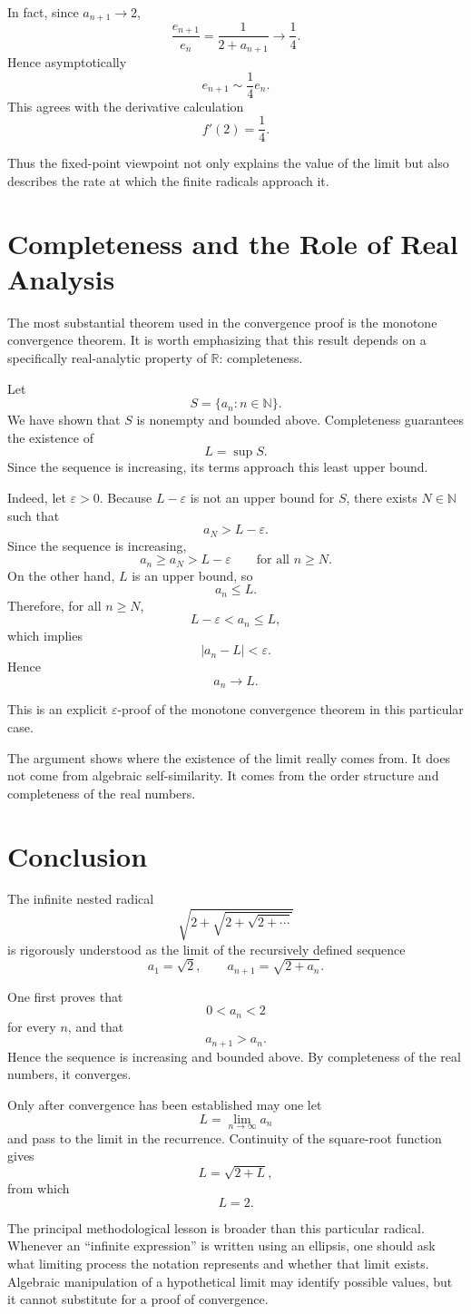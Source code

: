 \documentclass{essay}
\begin{document}
In fact, since \(a_{n+1}\to 2\),
\[
\frac{e_{n+1}}{e_n}
=
\frac{1}{2+a_{n+1}}
\longrightarrow
\frac14.
\]
Hence asymptotically
\[
e_{n+1}\sim \frac14 e_n.
\]
This agrees with the derivative calculation
\[
f'(2)=\frac14.
\]

Thus the fixed-point viewpoint not only explains the value of the limit but also describes the rate at which the finite radicals approach it.

\section{Completeness and the Role of Real Analysis}

The most substantial theorem used in the convergence proof is the monotone convergence theorem. It is worth emphasizing that this result depends on a specifically real-analytic property of \(\mathbb{R}\): completeness.

Let
\[
S=\{a_n:n\in\mathbb{N}\}.
\]
We have shown that \(S\) is nonempty and bounded above. Completeness guarantees the existence of
\[
L=\sup S.
\]
Since the sequence is increasing, its terms approach this least upper bound.

Indeed, let \(\varepsilon>0\). Because \(L-\varepsilon\) is not an upper bound for \(S\), there exists \(N\in\mathbb{N}\) such that
\[
a_N>L-\varepsilon.
\]
Since the sequence is increasing,
\[
a_n\geq a_N>L-\varepsilon
\qquad
\text{for all }n\geq N.
\]
On the other hand, \(L\) is an upper bound, so
\[
a_n\leq L.
\]
Therefore, for all \(n\geq N\),
\[
L-\varepsilon<a_n\leq L,
\]
which implies
\[
|a_n-L|<\varepsilon.
\]
Hence
\[
a_n\to L.
\]

This is an explicit \(\varepsilon\)-proof of the monotone convergence theorem in this particular case.

The argument shows where the existence of the limit really comes from. It does not come from algebraic self-similarity. It comes from the order structure and completeness of the real numbers.

\section{Conclusion}

The infinite nested radical
\[
\sqrt{2+\sqrt{2+\sqrt{2+\cdots}}}
\]
is rigorously understood as the limit of the recursively defined sequence
\[
a_1=\sqrt2,
\qquad
a_{n+1}=\sqrt{2+a_n}.
\]

One first proves that
\[
0<a_n<2
\]
for every \(n\), and that
\[
a_{n+1}>a_n.
\]
Hence the sequence is increasing and bounded above. By completeness of the real numbers, it converges.

Only after convergence has been established may one let
\[
L=\lim_{n\to\infty}a_n
\]
and pass to the limit in the recurrence. Continuity of the square-root function gives
\[
L=\sqrt{2+L},
\]
from which
\[
L=2.
\]

The principal methodological lesson is broader than this particular radical. Whenever an ``infinite expression'' is written using an ellipsis, one should ask what limiting process the notation represents and whether that limit exists. Algebraic manipulation of a hypothetical limit may identify possible values, but it cannot substitute for a proof of convergence.
\end{document}
